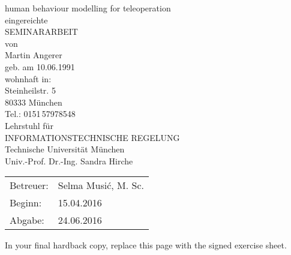 \documentclass[a4paper,twoside, openright,12pt]{report}
\begin{document}
\pagestyle{empty}
\enlargethispage{4.5cm} %
\begin{center}
\phantom{u}
\vspace{0.5cm}
\Huge{\sc human behaviour modelling for teleoperation}\\
\vspace{1.5cm}
                                 \large{eingereichte\\
			  SEMINARARBEIT\\%
                                           von\\

						\vspace{0.4cm}
					Martin Angerer\\
						\vspace{0.5cm}
					geb. am 10.06.1991\\
					wohnhaft in:\\
					Steinheilstr. 5\\
					80333 M\"unchen\\
					Tel.: 0151\,57978548\\
					\vspace{1.5cm}
					Lehrstuhl f\"ur\\
					INFORMATIONSTECHNISCHE REGELUNG \\
					Technische Universit\"at M\"unchen\\
					\vspace{0.6cm}
                    Univ.-Prof. Dr.-Ing. Sandra Hirche}
\end{center}
\vspace{5.0cm}
\begin{tabular}{ll}
Betreuer: & Selma Musi\'c, M. Sc.  \\
Beginn: & 15.04.2016  \\
Abgabe: &  24.06.2016 \\
\end{tabular}

\newpage
\cleardoublepage



\phantom{u}
\phantom{1}\vspace{6cm}
\begin{center}
In your final hardback copy, replace this page with the signed exercise sheet.
\end{center}
\end{document}

